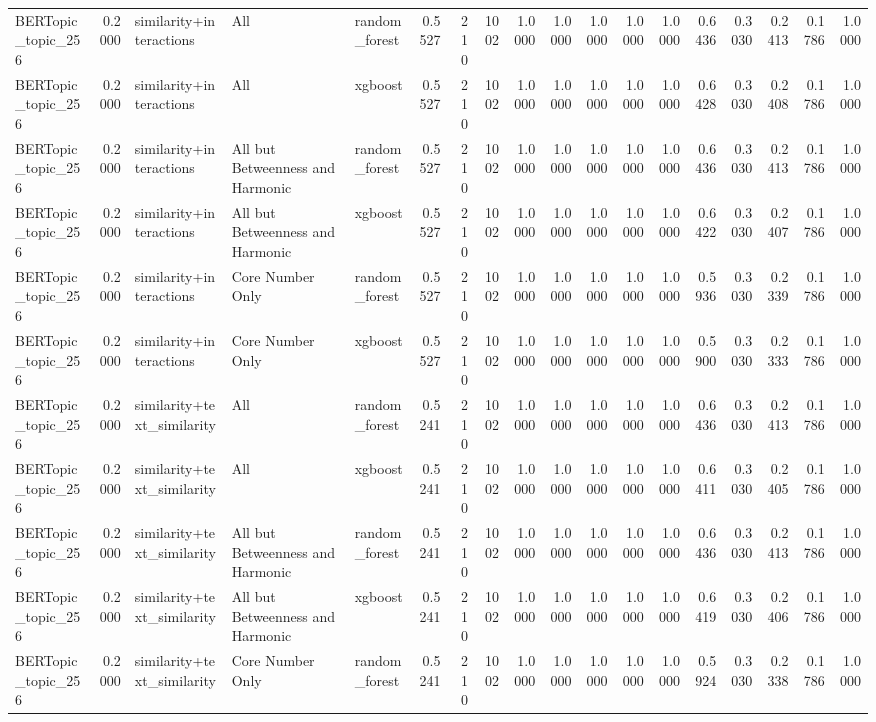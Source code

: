 \begin{tabular}{lrlllrrrrrrrrrrrrr}
BERTopic_topic_256 & 0.2000 & similarity+interactions & All & random_forest & 0.5527 & 210 & 1002 & 1.0000 & 1.0000 & 1.0000 & 1.0000 & 1.0000 & 0.6436 & 0.3030 & 0.2413 & 0.1786 & 1.0000 \\
BERTopic_topic_256 & 0.2000 & similarity+interactions & All & xgboost & 0.5527 & 210 & 1002 & 1.0000 & 1.0000 & 1.0000 & 1.0000 & 1.0000 & 0.6428 & 0.3030 & 0.2408 & 0.1786 & 1.0000 \\
BERTopic_topic_256 & 0.2000 & similarity+interactions & All but Betweenness and Harmonic & random_forest & 0.5527 & 210 & 1002 & 1.0000 & 1.0000 & 1.0000 & 1.0000 & 1.0000 & 0.6436 & 0.3030 & 0.2413 & 0.1786 & 1.0000 \\
BERTopic_topic_256 & 0.2000 & similarity+interactions & All but Betweenness and Harmonic & xgboost & 0.5527 & 210 & 1002 & 1.0000 & 1.0000 & 1.0000 & 1.0000 & 1.0000 & 0.6422 & 0.3030 & 0.2407 & 0.1786 & 1.0000 \\
BERTopic_topic_256 & 0.2000 & similarity+interactions & Core Number Only & random_forest & 0.5527 & 210 & 1002 & 1.0000 & 1.0000 & 1.0000 & 1.0000 & 1.0000 & 0.5936 & 0.3030 & 0.2339 & 0.1786 & 1.0000 \\
BERTopic_topic_256 & 0.2000 & similarity+interactions & Core Number Only & xgboost & 0.5527 & 210 & 1002 & 1.0000 & 1.0000 & 1.0000 & 1.0000 & 1.0000 & 0.5900 & 0.3030 & 0.2333 & 0.1786 & 1.0000 \\
BERTopic_topic_256 & 0.2000 & similarity+text_similarity & All & random_forest & 0.5241 & 210 & 1002 & 1.0000 & 1.0000 & 1.0000 & 1.0000 & 1.0000 & 0.6436 & 0.3030 & 0.2413 & 0.1786 & 1.0000 \\
BERTopic_topic_256 & 0.2000 & similarity+text_similarity & All & xgboost & 0.5241 & 210 & 1002 & 1.0000 & 1.0000 & 1.0000 & 1.0000 & 1.0000 & 0.6411 & 0.3030 & 0.2405 & 0.1786 & 1.0000 \\
BERTopic_topic_256 & 0.2000 & similarity+text_similarity & All but Betweenness and Harmonic & random_forest & 0.5241 & 210 & 1002 & 1.0000 & 1.0000 & 1.0000 & 1.0000 & 1.0000 & 0.6436 & 0.3030 & 0.2413 & 0.1786 & 1.0000 \\
BERTopic_topic_256 & 0.2000 & similarity+text_similarity & All but Betweenness and Harmonic & xgboost & 0.5241 & 210 & 1002 & 1.0000 & 1.0000 & 1.0000 & 1.0000 & 1.0000 & 0.6419 & 0.3030 & 0.2406 & 0.1786 & 1.0000 \\
BERTopic_topic_256 & 0.2000 & similarity+text_similarity & Core Number Only & random_forest & 0.5241 & 210 & 1002 & 1.0000 & 1.0000 & 1.0000 & 1.0000 & 1.0000 & 0.5924 & 0.3030 & 0.2338 & 0.1786 & 1.0000 \\

\end{tabular}
